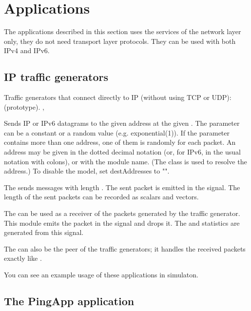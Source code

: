\section{Applications}

The applications described in this section uses the services of the network
layer only, they do not need transport layer protocols.
They can be used with both IPv4 and IPv6.

\subsection{IP traffic generators}

Traffic generators that connect directly to IP (without using TCP or UDP):
 (prototype).
 ,

Sends IP or IPv6 datagrams to the given address at the given .
The  parameter can be a constant or a random value (e.g. exponential(1)).
If the  parameter contains more than one address, one
of them is randomly for each packet. An address may be given in the
dotted decimal notation (or, for IPv6, in the usual notation with colons),
or with the module name. (The  class is used to resolve
the address.) To disable the model, set destAddresses to "".

The  sends messages with length .
The sent packet is emitted in the  signal.
The length of the sent packets can be recorded as scalars and vectors.


The  can be used as a receiver of the packets
generated by the traffic generator. This module emits the packet
in the  signal and drops it. The 
and  statistics are generated from this signal.

The  can also be the peer of the traffic generators;
it handles the received packets exactly like .

You can see an example usage of these applications in 
simulaton.

\subsection{The PingApp application}

